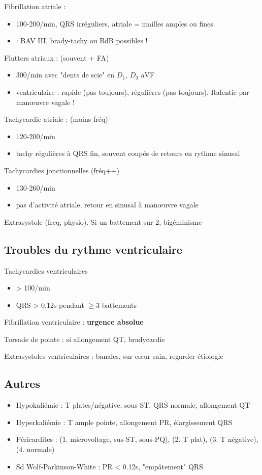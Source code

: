 \documentclass{article}
\begin{document}
Fibrillation atriale : 
\begin{itemize}
  \item 100-200/min, QRS irréguliers, atriale = mailles amples ou fines.
  \item \danger{} : BAV III, brady-tachy ou BdB possibles !
\end{itemize}
Flutters atriaux : (souvent + FA)
\begin{itemize}
  \item 300/min avec "dents de scie" en $D_1$, $D_3$ aVF
  \item ventriculaire : rapide (pas toujours), régulières (pas toujours).
    Ralentie par man\oe{}uvre vagale !
\end{itemize}
Tachycardie atriale : (moins fréq)
\begin{itemize}
  \item 120-200/min
  \item tachy régulières à QRS fin, souvent coupés de retours en rythme sinusal
\end{itemize}
Tachycardies jonctionnelles (fréq++)
\begin{itemize}
  \item 130-260/min
  \item pas d'activité atriale, retour en sinusal à man\oe{}uvre vagale
\end{itemize}
Extrasystole (freq, physio). Si un battement sur 2, bigéminisme

\subsection{Troubles du rythme ventriculaire}

Tachycardies ventriculaires
\begin{itemize}
  \item > 100/min
  \item QRS > 0.12s pendant $\ge 3$ battements
\end{itemize}
Fibrillation ventriculaire : \textbf{urgence absolue}  \skull

Torsade de pointe : si allongement QT, bradycardie

Extrasystoles ventriculaires : banales, sur c\oe{}ur sain, regarder étiologie

\subsection{Autres}
\begin{itemize}
  \item Hypokaliémie : T plates/négative, sous-ST, QRS normale, allongement QT
  \item Hyperkaliémie : T ample pointe, allongement PR, élargissement QRS
  \item Péricardites : (1. microvoltage, sus-ST, sous-PQ), (2. T plat), (3. T
    négative), (4. normale)
  \item Sd Wolf-Parkinson-White : PR < 0.12s, "empâtement" QRS
\end{itemize}
\end{document}
